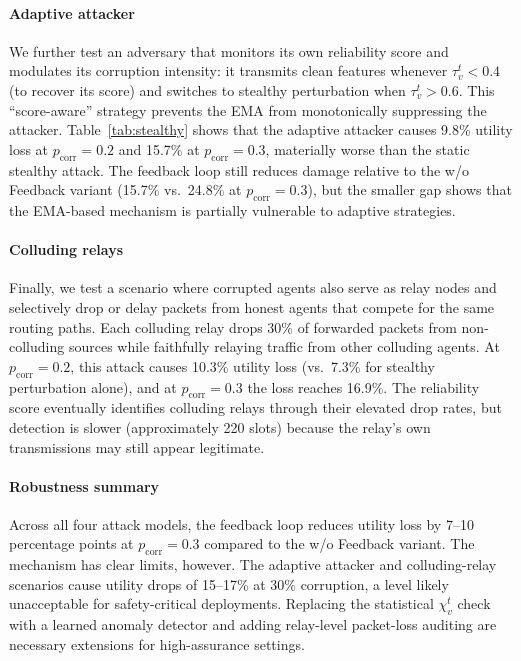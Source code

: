 \documentclass[final,3p,times,review,sort&compress]{elsarticle}
\begin{document}
\paragraph{Adaptive attacker}
We further test an adversary that monitors its own reliability score and modulates its corruption intensity: it transmits clean features whenever $\tau_v^t < 0.4$ (to recover its score) and switches to stealthy perturbation when $\tau_v^t > 0.6$. This ``score-aware'' strategy prevents the EMA from monotonically suppressing the attacker. Table~\ref{tab:stealthy} shows that the adaptive attacker causes 9.8\% utility loss at $p_{\mathrm{corr}}{=}0.2$ and 15.7\% at $p_{\mathrm{corr}}{=}0.3$, materially worse than the static stealthy attack. The feedback loop still reduces damage relative to the w/o Feedback variant (15.7\% vs.\ 24.8\% at $p_{\mathrm{corr}}{=}0.3$), but the smaller gap shows that the EMA-based mechanism is partially vulnerable to adaptive strategies.

\paragraph{Colluding relays}
Finally, we test a scenario where corrupted agents also serve as relay nodes and selectively drop or delay packets from honest agents that compete for the same routing paths. Each colluding relay drops 30\% of forwarded packets from non-colluding sources while faithfully relaying traffic from other colluding agents. At $p_{\mathrm{corr}}{=}0.2$, this attack causes 10.3\% utility loss (vs.\ 7.3\% for stealthy perturbation alone), and at $p_{\mathrm{corr}}{=}0.3$ the loss reaches 16.9\%. The reliability score eventually identifies colluding relays through their elevated drop rates, but detection is slower (approximately 220 slots) because the relay's own transmissions may still appear legitimate.

\paragraph{Robustness summary}
Across all four attack models, the feedback loop reduces utility loss by 7--10 percentage points at $p_{\mathrm{corr}}{=}0.3$ compared to the w/o Feedback variant. The mechanism has clear limits, however. The adaptive attacker and colluding-relay scenarios cause utility drops of 15--17\% at 30\% corruption, a level likely unacceptable for safety-critical deployments. Replacing the statistical $\chi_v^t$ check with a learned anomaly detector and adding relay-level packet-loss auditing are necessary extensions for high-assurance settings.
\end{document}
